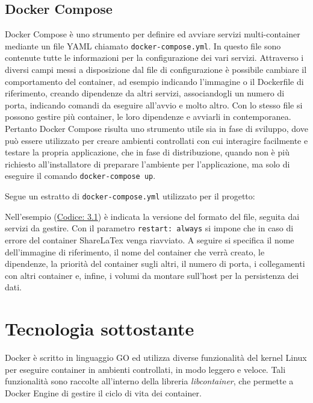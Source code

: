 \subsection{Docker Compose}
Docker Compose è uno strumento per definire ed avviare servizi multi-container mediante un file YAML chiamato \verb|docker-compose.yml|. In questo file sono contenute tutte le informazioni per la configurazione dei vari servizi. Attraverso i diversi campi messi a disposizione dal file di configurazione è possibile cambiare il comportamento del container, ad esempio indicando l'immagine o il Dockerfile di riferimento, creando dipendenze da altri servizi, associandogli un numero di porta, indicando comandi da eseguire all'avvio e molto altro. Con lo stesso file si possono gestire più container, le loro dipendenze e avviarli in contemporanea. Pertanto Docker Compose risulta uno strumento utile sia in fase di sviluppo, dove può essere utilizzato per creare ambienti controllati con cui interagire facilmente e testare la propria applicazione, che in fase di distribuzione, quando non è più richiesto all'installatore di preparare l'ambiente per l'applicazione, ma solo di eseguire il comando \verb|docker-compose up|.

Segue un estratto di \verb|docker-compose.yml| utilizzato per il progetto:

Nell'esempio (\hyperref[esempio_dcyml]{Codice: 3.1}) è indicata la versione del formato del file, seguita dai servizi da gestire. Con il parametro \verb|restart: always| si impone che in caso di errore del container ShareLaTex venga riavviato. A seguire si specifica il nome dell'immagine di riferimento, il nome del container che verrà creato, le dipendenze, la priorità del container sugli altri, il numero di porta, i collegamenti con altri container e, infine, i volumi da montare sull'host per la persistenza dei dati.
 
\section{Tecnologia sottostante}
Docker è scritto in linguaggio GO ed utilizza diverse funzionalità del kernel Linux per eseguire container in ambienti controllati, in modo leggero e veloce. Tali funzionalità sono raccolte all'interno della libreria \emph{libcontainer}, che permette a Docker Engine di gestire il ciclo di vita dei container.

